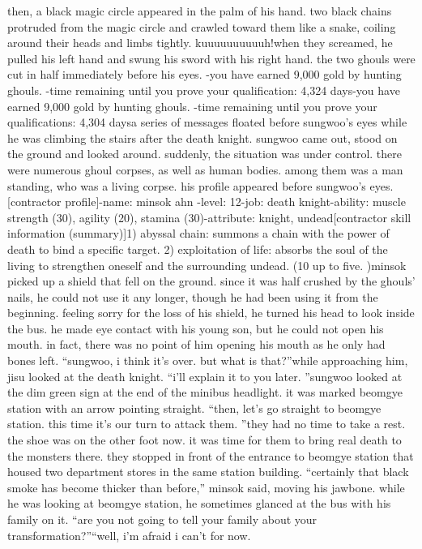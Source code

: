  then, a black magic circle appeared in the palm of his hand.
two black chains protruded from the magic circle and crawled toward them like a snake, coiling around their heads and limbs tightly.
kuuuuuuuuuuh!when they screamed, he pulled his left hand and swung his sword with his right hand.
the two ghouls were cut in half immediately before his eyes.
-you have earned 9,000 gold by hunting ghouls.
-time remaining until you prove your qualification: 4,324 days-you have earned 9,000 gold by hunting ghouls.
-time remaining until you prove your qualifications: 4,304 daysa series of messages floated before sungwoo’s eyes while he was climbing the stairs after the death knight.
 sungwoo came out, stood on the ground and looked around.
 suddenly, the situation was under control.
there were numerous ghoul corpses, as well as human bodies.
 among them was a man standing, who was a living corpse.
his profile appeared before sungwoo’s eyes.
[contractor profile]-name: minsok ahn
-level: 12-job: death knight-ability: muscle strength (30), agility (20), stamina (30)-attribute: knight, undead[contractor skill information (summary)]1) abyssal chain: summons a chain with the power of death to bind a specific target.
2) exploitation of life: absorbs the soul of the living to strengthen oneself and the surrounding undead.
 (10%
 up to five.
)minsok picked up a shield that fell on the ground.
 since it was half crushed by the ghouls’ nails, he could not use it any longer, though he had been using it from the beginning.
feeling sorry for the loss of his shield, he turned his head to look inside the bus.
 he made eye contact with his young son, but he could not open his mouth.
 in fact, there was no point of him opening his mouth as he only had bones left.
“sungwoo, i think it’s over.
 but what is that?”while approaching him, jisu looked at the death knight.
“i’ll explain it to you later.
”sungwoo looked at the dim green sign at the end of the minibus headlight.
 it was marked beomgye station with an arrow pointing straight.
“then, let’s go straight to beomgye station.
 this time it’s our turn to attack them.
”they had no time to take a rest.
 the shoe was on the other foot now.
it was time for them to bring real death to the monsters there.
they stopped in front of the entrance to beomgye station that housed two department stores in the same station building.
“certainly that black smoke has become thicker than before,” minsok said, moving his jawbone.
 while he was looking at beomgye station, he sometimes glanced at the bus with his family on it.
“are you not going to tell your family about your transformation?”“well, i’m afraid i can’t for now.
